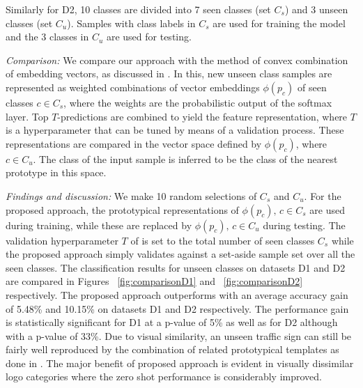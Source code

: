 \documentclass{bmvc2k}
\begin{document}
Similarly for D2, 10 classes are divided into 7 seen classes (set $C_s$) and 3
unseen classes (set $C_u$). Samples with class labels in $C_s$ are used for
training the model and the 3 classes in $C_u$ are used for testing.

\textit{Comparison:} We compare our approach with the method
of convex combination of embedding vectors, as
discussed in \cite{norouzi2013zero}. In this, new unseen class samples are represented as
weighted combinations of vector embeddings $\phi(p_c)$ of seen classes $c \in
C_s$, where the weights are the probabilistic output of the softmax layer. Top
$T$-predictions are combined to yield the feature representation, where $T$ is a
hyperparameter that can be tuned by means of a validation process. These
representations are compared in the vector space defined by
$\phi(p_c)$, where $c \in C_u$.
The class of the input sample is inferred to be the class of the nearest
prototype in this space.

\textit{Findings and discussion:} We make 10 random selections of $C_s$ and
$C_u$. For the proposed approach, the prototypical
representations of $\phi(p_c),\,c\in C_s$ are used during training, while these are replaced 
by $\phi(p_c),\,c\in C_u$ during testing. The validation
hyperparameter $T$ of \cite{norouzi2013zero} is set to the total
number of seen classes $C_s$ while the proposed approach simply
validates against a set-aside sample set over all the seen classes.
The classification results for unseen classes on datasets D1 and D2 
are compared in Figures ~\ref{fig:comparisonD1} and ~\ref{fig:comparisonD2}
respectively.
The proposed approach outperforms \cite{norouzi2013zero} with an average
accuracy gain of 5.48\% and 10.15\% on datasets D1 and D2 respectively. The
performance gain is statistically significant for D1 at a p-value of 5\% as well
as for D2 although with a p-value of 33\%.
Due to visual similarity, an unseen traffic sign can still be fairly well reproduced by the combination of
related prototypical templates as done in \cite{norouzi2013zero}. The major
benefit of proposed approach is evident in visually dissimilar logo categories
where the zero shot performance is considerably improved.
\end{document}
